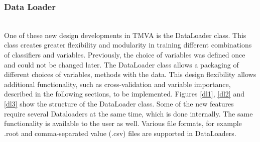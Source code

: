 \documentclass[a4paper]{jpconf}
\begin{document}
\subsubsection{Data Loader}\hspace*{\fill} \\
One of these new design developments in TMVA is the DataLoader class. This class creates greater flexibility and modularity in training different combinations of classifiers and variables. Previously, the choice of variables was defined once and could not be changed later. The DataLoader class allows a packaging of different choices of variables, methods with the data. This design flexibility allows additional functionality, such as cross-validation and variable importance, described in the following sections, to be implemented.\newline\newline
Figures \ref{dl1}, \ref{dl2} and \ref{dl3} show the structure of the DataLoader class. Some of the new features require several Dataloaders at the same time, which is done internally. The same functionality is available to the user as well. Various file formats, for example .root and comma-separated value (.csv) files are supported in DataLoaders.
\end{document}
